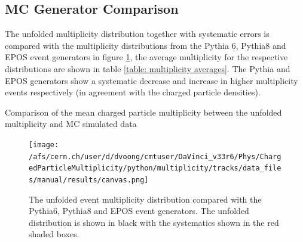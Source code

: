 \subsection*{MC Generator Comparison}

The unfolded multiplicity distribution together with systematic errors is compared with the multiplicity distributions from the Pythia 6, Pythia8 and EPOS event generators in figure \ref{fig: unfolded multiplicity generator comparison}, the average multiplicity for the respective distributions are shown in table \ref{table: multiplicity averages}. The Pythia and EPOS generators show a systematic decrease and increase in higher multiplicity events respectively (in agreement with the charged particle densities).

\begin{table}
	\centering
	\caption{Comparison of the mean charged particle multiplicity between the unfolded multiplicity and MC simulated data}
	\label{table: multiplicity averages}
	
\end{table}

\begin{figure}[h]
	\texttt{[image: /afs/cern.ch/user/d/dvoong/cmtuser/DaVinci\_v33r6/Phys/ChargedParticleMultiplicity/python/multiplicity/tracks/data\_files/manual/results/canvas.png]}
	\caption{The unfolded event multiplicity distribution compared with the Pythia6, Pythia8 and EPOS event generators. The unfolded distribution is shown in black with the systematics shown in the red shaded boxes.}
	\label{fig: unfolded multiplicity generator comparison}
\end{figure}


